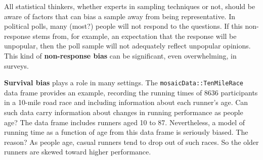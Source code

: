 \documentclass[
  letterpaper,
  DIV=11,
  numbers=noendperiod,
  oneside]{scrartcl}
\begin{document}
All statistical thinkers, whether experts in sampling techniques or not,
should be aware of factors that can bias a sample away from being
representative. In political polls, many (most?) people will not respond
to the questions. If this non-response stems from, for example, an
expectation that the response will be unpopular, then the poll sample
will not adequately reflect unpopular opinions. This kind of
\textbf{non-response bias} can be significant, even overwhelming, in
surveys.

\textbf{Survival bias} plays a role in many settings. The
\texttt{mosaicData::TenMileRace} data frame provides an example,
recording the running times of 8636 participants in a 10-mile road race
and including information about each runner's age. Can such data carry
information about changes in running performance as people age? The data
frame includes runners aged 10 to 87. Nevertheless, a model of running
time as a function of age from this data frame is seriously biased. The
reason? As people age, casual runners tend to drop out of such races. So
the older runners are skewed toward higher performance.
\end{document}

